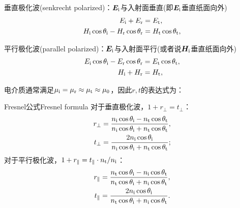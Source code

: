 \begin{compactenum}
	\item 垂直极化波(senkrecht polarized)：$\bm E_{\mathrm{i}}$与入射面垂直(即$\bm E_{\mathrm{i}}$垂直纸面向外)%
	\begin{align*}
        E_{\mathrm{i}}+E_\text r&=E_\text t,\\
        H_{\mathrm{i}}\cos\theta_{\mathrm{i}}-H_\text r\cos\theta_\text r&=H_\text t\cos\theta_\text t,
    \end{align*}
    \item 平行极化波(parallel polarized)：$\bm E_{\mathrm{i}}$与入射面平行(或者说$\bm H_{\mathrm{i}}$垂直纸面向外)
    \begin{align*}
        E_{\mathrm{i}}\cos\theta_{\mathrm{i}}-E_\text r\cos\theta_\text r&=E_\text t\cos\theta_\text t,\\
        H_{\mathrm{i}}+H_\text r&=H_\text t,
    \end{align*}
\end{compactenum}
电介质通常满足$\mu_{\mathrm{i}}=\mu_\text r\approx\mu_\text t\approx\mu_0$，因此$r,t$的表达式为：
\begin{theorem}
    {Fresnel公式}{Fresnel formula}
    对于垂直极化波，$1+r_\perp=t_\perp$：
    \begin{subequations}
        \begin{align}
            \label{eqn:Fresnel rperp}
            r_\perp&=\frac{n_\i\cos\theta_\i-n_\t\cos\theta_\t}{n_\i\cos\theta_\i+n_\t\cos\theta_\t},\\%
            \label{eqn:Fresnel tperp}
            t_\perp&=\frac{2n_\i\cos\theta_\i}{n_\i\cos\theta_\i+n_\t\cos\theta_\t};%
        \end{align}
    \end{subequations}
    对于平行极化波，$1+r_\parallel=t_\parallel\cdot n_\text t/n_{\mathrm{i}}$：
    \begin{subequations}
        \begin{align}
            \label{eqn:Fresnel rpara}
            r_\parallel&=\frac{n_\text t\cos\theta_{\mathrm{i}}-n_{\mathrm{i}}\cos\theta_\text t}{n_\text t\cos\theta_{\mathrm{i}}+n_{\mathrm{i}}\cos\theta_\text t},\\
            \label{eqn:Fresnel tpara}
            t_\parallel&=\frac{2n_{\mathrm{i}}\cos\theta_{\mathrm{i}}}{n_\text t\cos\theta_{\mathrm{i}}+n_{\mathrm{i}}\cos\theta_\text t}.
        \end{align}
    \end{subequations}
\end{theorem}
    
